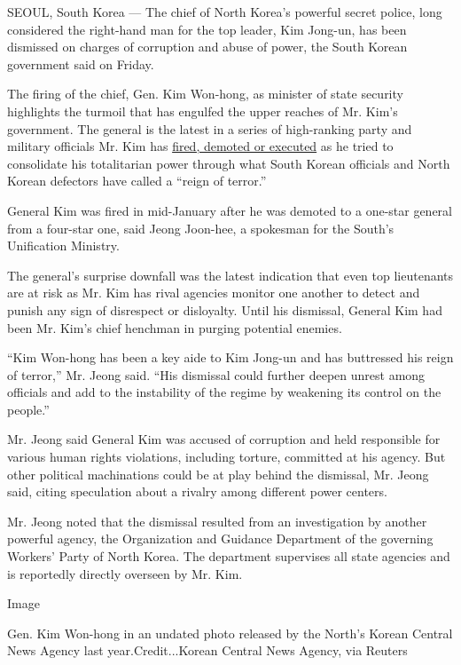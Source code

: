 SEOUL, South Korea --- The chief of North Korea's powerful secret
police, long considered the right-hand man for the top leader, Kim
Jong-un, has been dismissed on charges of corruption and abuse of power,
the South Korean government said on Friday.

The firing of the chief, Gen. Kim Won-hong, as minister of state
security highlights the turmoil that has engulfed the upper reaches of
Mr. Kim's government. The general is the latest in a series of
high-ranking party and military officials Mr. Kim has
\href{https://www.nytimes3xbfgragh.onion/2016/09/01/world/asia/north-korea-executes-deputy-premier.html?_r=0}{fired,
demoted or executed} as he tried to consolidate his totalitarian power
through what South Korean officials and North Korean defectors have
called a ``reign of terror.''

General Kim was fired in mid-January after he was demoted to a one-star
general from a four-star one, said Jeong Joon-hee, a spokesman for the
South's Unification Ministry.

The general's surprise downfall was the latest indication that even top
lieutenants are at risk as Mr. Kim has rival agencies monitor one
another to detect and punish any sign of disrespect or disloyalty. Until
his dismissal, General Kim had been Mr. Kim's chief henchman in purging
potential enemies.

``Kim Won-hong has been a key aide to Kim Jong-un and has buttressed his
reign of terror,'' Mr. Jeong said. ``His dismissal could further deepen
unrest among officials and add to the instability of the regime by
weakening its control on the people.''

Mr. Jeong said General Kim was accused of corruption and held
responsible for various human rights violations, including torture,
committed at his agency. But other political machinations could be at
play behind the dismissal, Mr. Jeong said, citing speculation about a
rivalry among different power centers.

Mr. Jeong noted that the dismissal resulted from an investigation by
another powerful agency, the Organization and Guidance Department of the
governing Workers' Party of North Korea. The department supervises all
state agencies and is reportedly directly overseen by Mr. Kim.

Image

Gen. Kim Won-hong in an undated photo released by the North's Korean
Central News Agency last year.Credit...Korean Central News Agency, via
Reuters

